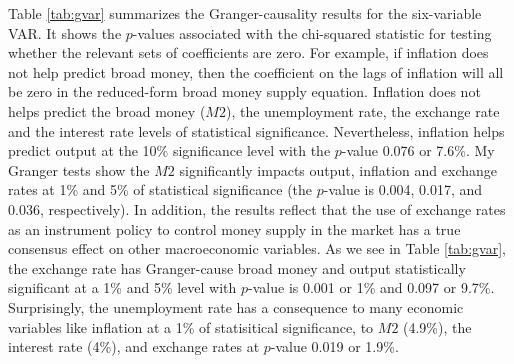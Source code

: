 \documentclass[11pt]{article}
\newif\ifstickappendix
\newcommand{\AppendixName}{appendix.tex}
\newcommand*{\RefsPath}{../references}
\newcommand*{\RefsPath}{docs/references}
\begin{document}
\begin{figure}[H]
\end{figure}

Table \ref{tab:gvar} summarizes the Granger-causality results for the six-variable VAR. It shows the $p$-values associated with the chi-squared statistic for testing whether the relevant sets of coefficients are zero. For example, if inflation does not help predict broad money, then the coefficient on the lags of inflation will all be zero in the reduced-form broad money supply equation. Inflation does not helps predict the broad money ($M2$), the unemployment rate, the exchange rate and the interest rate levels of statistical significance. Nevertheless, inflation helps predict output at the 10\% significance level with the $p$-value 0.076 or 7.6\%. My Granger tests show the $M2$ significantly impacts output, inflation and exchange rates at 1\% and 5\% of statistical significance (the $p$-value is 0.004, 0.017, and 0.036, respectively). In addition, the results reflect that the use of exchange rates as an instrument policy to control money supply in the market has a true consensus effect on other macroeconomic variables. As we see in Table \ref{tab:gvar}, the exchange rate has Granger-cause broad money and output statistically significant at a 1\% and 5\% level with $p$-value is 0.001 or 1\% and 0.097 or 9.7\%. Surprisingly, the unemployment rate has a consequence to many economic variables like inflation at a 1\% of statisitical significance, to $M2$ (4.9\%), the interest rate (4\%), and exchange rates at $p$-value 0.019 or 1.9\%.


\clearpage\newpage

%

\clearpage

\ifstickappendix
  \processdelayedfloats
  
\fi

\end{document}

